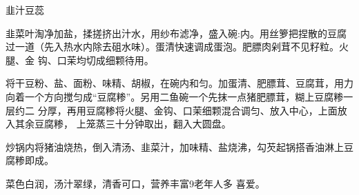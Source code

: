 \begin{recipe}{韭汁豆蕊}

\ingredients


\preparation

\step 韭菜叶淘净加盐，揉搓挤出汁水，用纱布滤净，盛入碗:内。用丝箩把捏散的豆腐
过一道（先入热水内除去砠水味）。蛋清快速调成蛋泡。肥膘肉剁茸不见籽粒。火腿、金
钩、口茉均切成细颗待用。

\step 将干豆粉、盐、面粉、味精、胡椒，在碗内和匀。加蛋清、肥膘茸、豆腐茸，用力
向着一个方向搅匀成“豆腐糁”。另用二鱼碗一个先抹一点猪肥膘茸，糊上豆腐糁一层约二
分厚，再用豆腐糁将火腿、金钩、口茉细颗混合调匀、放入中心，上面放入其余豆腐糁，
上笼蒸三十分钟取出，翻入大圆盘。

\step 炒锅内将猪油烧热，倒入清汤、韭菜汁，加味精、盐烧沸，勾芡起锅搭香油淋上豆
腐糁即成。

\features

菜色白润，汤汁翠绿，清香可口，营养丰富9老年人多 喜爱。

\end{recipe}

